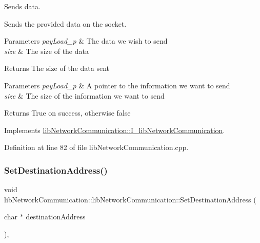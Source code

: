 Sends data. 

Sends the provided data on the socket.


\begin{DoxyParams}{Parameters}
{\em pay\+Load\+\_\+p} & The data we wish to send \\
\hline
{\em size} & The size of the data \\
\hline
\end{DoxyParams}
\begin{DoxyReturn}{Returns}
The size of the data sent
\end{DoxyReturn}

\begin{DoxyParams}{Parameters}
{\em pay\+Load\+\_\+p} & A pointer to the information we want to send \\
\hline
{\em size} & The size of the information we want to send \\
\hline
\end{DoxyParams}
\begin{DoxyReturn}{Returns}
True on success, otherwise false 
\end{DoxyReturn}


Implements \mbox{\hyperlink{classlibNetworkCommunication_1_1I__libNetworkCommunication_add643ce010a3712f9097dc36f45bfd50}{lib\+Network\+Communication\+::\+I\+\_\+lib\+Network\+Communication}}.



Definition at line 82 of file lib\+Network\+Communication.\+cpp.

\mbox{\label{classlibNetworkCommunication_1_1libNetworkCommunication_a124f9b26150321f01f0998e558bf1d76}} 
\subsubsection{\texorpdfstring{SetDestinationAddress()}{SetDestinationAddress()}}
{\footnotesize\ttfamily void lib\+Network\+Communication\+::lib\+Network\+Communication\+::\+Set\+Destination\+Address (\begin{DoxyParamCaption}\item[{char $\ast$}]{destination\+Address }\end{DoxyParamCaption})\hspace{0.3cm}{\ttfamily [override]}, {\ttfamily [virtual]}}



